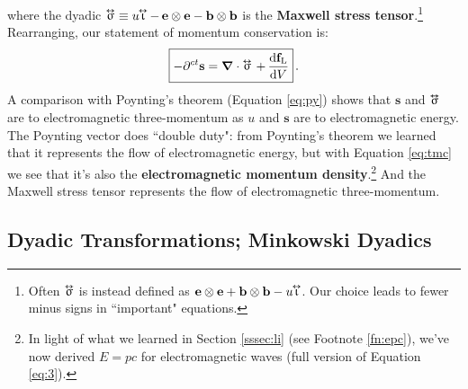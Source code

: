 \documentclass[12pt]{article}
\renewcommand{\vv}[1]{\mathbf{#1}}
\newcommand{\dd}[1]{\mathrm{d}#1}
\newcommand{\del}{\boldsymbol{\nabla}}
\newcommand{\tightoverset}[2]{%
  \mathop{#2}\limits^{\vbox to -.5ex{\kern-0.75ex\hbox{$#1$}\vss}}}
\newcommand{\inlinedy}[1]{\tightoverset{\text{\tiny$\bm\leftrightarrow$}}{#1}}
\begin{document}
where the dyadic $\inlinedy{\upsigma} \equiv u \mkern-4.5mu \inlinedy{\upiota} - \, \vv e \otimes \vv e - \vv b \otimes \vv b$ is the \textbf{Maxwell stress tensor}.\footnote{Often $\inlinedy{\upsigma}$ is instead defined as $\vv e \otimes \vv e + \vv b \otimes \vv b - u \mkern-4.5mu \inlinedy{\upiota}$. Our choice leads to fewer minus signs in ``important" equations.} Rearranging, our statement of momentum conservation is:
\begin{equation}\label{eq:tmc}
\boxed{ - \partial^{ct} \vv s = \del \cdot \inlinedy{\upsigma} \, + \, \dfrac{\dd \vv f_{\mathrm{L}}}{\dd V} } \, .
\end{equation}
A comparison with Poynting's theorem (Equation \ref{eq:py}) shows that $\vv s$ and $\inlinedy{\upsigma}$ are to electromagnetic three-momentum as $u$ and $\vv s$ are to electromagnetic energy. The Poynting vector does ``double duty": from Poynting's theorem we learned that it represents the flow of electromagnetic energy, but with Equation \ref{eq:tmc} we see that it's also the \textbf{electromagnetic momentum density}.\footnote{In light of what we learned in Section \ref{sssec:li} (see Footnote \ref{fn:epc}), we've now derived $E = pc$ for electromagnetic waves (full version of Equation \ref{eq:3}).} And the Maxwell stress tensor represents the flow of electromagnetic three-momentum.


\subsection{Dyadic Transformations; Minkowski Dyadics}\label{sssec:md}
\end{document}

